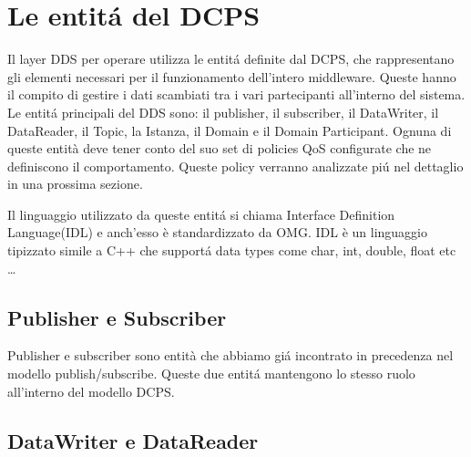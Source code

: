 

\section{Le entitá del DCPS}
Il layer DDS per operare utilizza le entitá definite dal DCPS, 
che rappresentano gli elementi necessari
per il funzionamento dell'intero middleware. Queste hanno il compito di 
gestire i dati
scambiati tra i vari partecipanti all'interno del sistema. 
Le entitá principali del DDS sono: 
il publisher, il subscriber, il DataWriter, il DataReader, il Topic,
la Istanza, il Domain e il Domain Participant.
Ognuna di queste entità deve tener conto del suo set di policies 
QoS configurate
che ne definiscono il comportamento. Queste policy verranno analizzate 
piú nel dettaglio in una prossima sezione.

Il linguaggio utilizzato da queste entitá si chiama Interface 
Definition Language(IDL) e anch'esso è standardizzato da OMG. 
IDL è un linguaggio tipizzato 
simile a C++ che supportá data types come char, int, double, float etc
\cite{1494965} \dots


\subsection{Publisher e Subscriber}
Publisher e subscriber sono entità che abbiamo giá incontrato
in precedenza nel modello publish/subscribe. Queste due entitá 
mantengono lo stesso ruolo all'interno del modello DCPS.

\subsection{DataWriter e DataReader}

